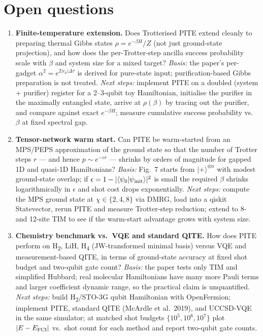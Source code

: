 \section{Open questions}

\begin{enumerate}
  \item \textbf{Finite-temperature extension.} Does Trotterised PITE extend
        cleanly to preparing thermal Gibbs states $\rho = e^{-\beta H}/Z$
        (not just ground-state projection), and how does the per-Trotter-step
        ancilla success probability scale with $\beta$ and system size for a
        mixed target?
        \emph{Basis:} the paper's per-gadget $\alpha^2 = e^{2|c_k|\Delta\tau}$
        is derived for pure-state input; purification-based Gibbs preparation
        is not treated.
        \emph{Next steps:} implement PITE on a doubled (system + purifier)
        register for a 2--3-qubit toy Hamiltonian, initialise the purifier in
        the maximally entangled state, arrive at $\rho(\beta)$ by tracing out
        the purifier, and compare against exact $e^{-\beta H}$; measure
        cumulative success probability vs.\ $\beta$ at fixed spectral gap.

  \item \textbf{Tensor-network warm start.} Can PITE be warm-started from an
        MPS/PEPS approximation of the ground state so that the number of
        Trotter steps $r$ --- and hence $p \sim e^{-cr}$ --- shrinks by orders
        of magnitude for gapped 1D and quasi-1D Hamiltonians?
        \emph{Basis:} Fig.~7 starts from $|+\rangle^{\otimes n}$ with modest
        ground-state overlap; if $\epsilon = 1 - |\langle\psi_0|\psi_{\rm init}\rangle|^2$
        is small the required $\beta$ shrinks logarithmically in $\epsilon$
        and shot cost drops exponentially.
        \emph{Next steps:} compute the MPS ground state at $\chi \in \{2,4,8\}$
        via DMRG, load into a qiskit Statevector, rerun PITE and measure
        Trotter-step reduction; extend to 8- and 12-site TIM to see if the
        warm-start advantage grows with system size.

  \item \textbf{Chemistry benchmark vs.\ VQE and standard QITE.} How does PITE
        perform on H\textsubscript{2}, LiH, H\textsubscript{4} (JW-transformed
        minimal basis) versus VQE and measurement-based QITE, in terms of
        ground-state accuracy at fixed shot budget and two-qubit gate count?
        \emph{Basis:} the paper tests only TIM and simplified Hubbard; real
        molecular Hamiltonians have many more Pauli terms and larger
        coefficient dynamic range, so the practical claim is unquantified.
        \emph{Next steps:} build H\textsubscript{2}/STO-3G qubit Hamiltonian
        with OpenFermion; implement PITE, standard QITE (McArdle et al.\
        2019), and UCCSD-VQE in the same simulator; at matched shot budgets
        $\{10^5, 10^6, 10^7\}$ plot $|E - E_{\rm FCI}|$ vs.\ shot count for
        each method and report two-qubit gate counts.


\end{enumerate}
